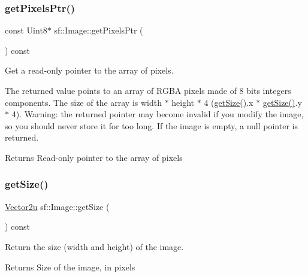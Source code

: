 \subsubsection{\texorpdfstring{get\+Pixels\+Ptr()}{getPixelsPtr()}}
{\footnotesize\ttfamily const Uint8$\ast$ sf\+::\+Image\+::get\+Pixels\+Ptr (\begin{DoxyParamCaption}{ }\end{DoxyParamCaption}) const}



Get a read-\/only pointer to the array of pixels. 

The returned value points to an array of R\+G\+BA pixels made of 8 bits integers components. The size of the array is width $\ast$ height $\ast$ 4 (\hyperlink{classsf_1_1_image_a85409951b05369813069ed64393391ce}{get\+Size()}.x $\ast$ \hyperlink{classsf_1_1_image_a85409951b05369813069ed64393391ce}{get\+Size()}.y $\ast$ 4). Warning\+: the returned pointer may become invalid if you modify the image, so you should never store it for too long. If the image is empty, a null pointer is returned.

\begin{DoxyReturn}{Returns}
Read-\/only pointer to the array of pixels 
\end{DoxyReturn}
\mbox{\label{classsf_1_1_image_a85409951b05369813069ed64393391ce}} 
\subsubsection{\texorpdfstring{get\+Size()}{getSize()}}
{\footnotesize\ttfamily \hyperlink{classsf_1_1_vector2}{Vector2u} sf\+::\+Image\+::get\+Size (\begin{DoxyParamCaption}{ }\end{DoxyParamCaption}) const}



Return the size (width and height) of the image. 

\begin{DoxyReturn}{Returns}
Size of the image, in pixels 
\end{DoxyReturn}
\mbox{\label{classsf_1_1_image_a9e4f2aa8e36d0cabde5ed5a4ef80290b}} 
